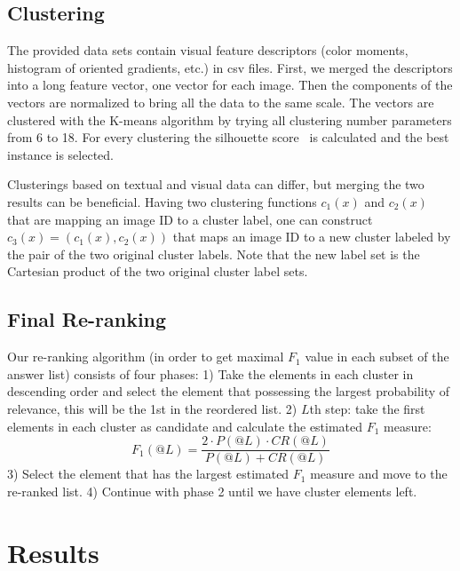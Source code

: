 \documentclass{acm_proc_article-me}
\begin{document}
\subsection{Clustering}
\label{sec:clust}

The provided data sets contain visual feature descriptors (color moments, histogram of oriented gradients, etc.) in csv files. First, we merged the descriptors into a long feature vector, one vector for each image. Then the components of the vectors are normalized to bring all the data to the same scale. The vectors are clustered with the K-means algorithm by trying all clustering number parameters from 6 to 18. For every clustering the silhouette score~\cite{rousseeuw1987silhouettes} is calculated and the best instance is selected.

Clusterings based on textual and visual data can differ, but merging the two results can be beneficial. Having two clustering functions $c_1(x)$ and $c_2(x)$ that are mapping an image ID to a cluster label, one can construct $c_3(x) = (c_1(x), c_2(x))$ that maps an image ID to a new cluster labeled by the pair of the two original cluster labels. Note that the new label set is the Cartesian product of the two original cluster label sets.

\subsection{Final Re-ranking}

Our re-ranking algorithm (in order to get maximal $F_1$ value in each subset of the answer list) consists of four phases:
1) Take the elements in each cluster in descending order and select the element that possessing the largest probability of relevance, this will be the 1st in the reordered list.
2) $L$th step: take the first elements in each cluster as candidate and calculate the estimated $F_1$ measure: \begin{equation} F_1(@L) = \frac{2 \cdot P(@L) \cdot CR(@L)}{P(@L) + CR(@L)} \end{equation}
3) Select the element that has the largest estimated $F_1$ measure and move to the re-ranked list.
4) Continue with phase 2 until we have cluster elements left.

\section{Results}
\end{document}
